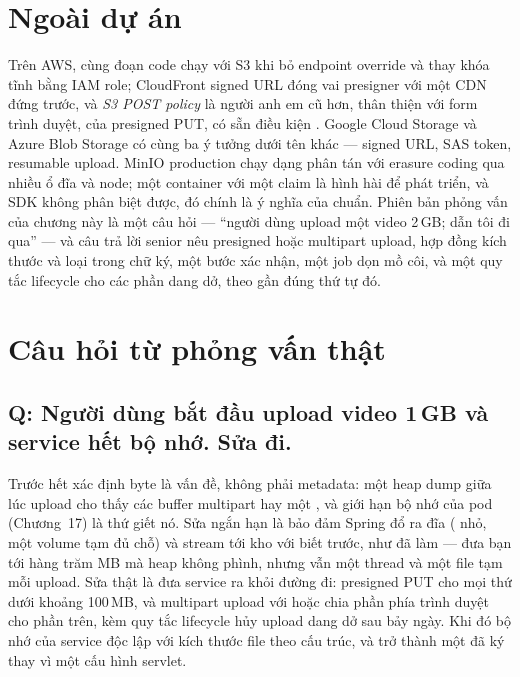 \section{Ngoài dự án}

Trên AWS, cùng đoạn code chạy với S3 khi bỏ endpoint override và thay
khóa tĩnh bằng IAM role; CloudFront signed URL đóng vai presigner với
một CDN đứng trước, và \emph{S3 POST policy} là người anh em cũ hơn,
thân thiện với form trình duyệt, của presigned PUT, có sẵn điều kiện
. Google Cloud Storage và Azure Blob Storage
có cùng ba ý tưởng dưới tên khác --- signed URL, SAS token, resumable
upload. MinIO production chạy dạng phân tán với erasure coding qua nhiều
ổ đĩa và node; một container với một claim là hình hài để phát triển,
và SDK không phân biệt được, đó chính là ý nghĩa của chuẩn. Phiên bản
phỏng vấn của chương này là một câu hỏi --- ``người dùng upload một
video 2\,GB; dẫn tôi đi qua'' --- và câu trả lời senior nêu presigned
hoặc multipart upload, hợp đồng kích thước và loại trong chữ ký, một
bước xác nhận, một job dọn mồ côi, và một quy tắc lifecycle cho các
phần dang dở, theo gần đúng thứ tự đó.

\section{Câu hỏi từ phỏng vấn thật}

\subsection*{Q: Người dùng bắt đầu upload video 1\,GB và service hết bộ nhớ. Sửa đi.}

Trước hết xác định byte là vấn đề, không phải metadata: một heap dump
giữa lúc upload cho thấy các buffer multipart hay một
, và giới hạn bộ nhớ của pod (Chương~17) là
thứ giết nó. Sửa ngắn hạn là bảo đảm Spring đổ ra đĩa
( nhỏ, một volume tạm đủ chỗ) và stream tới
kho với  biết trước, như
 đã làm --- đưa bạn tới hàng trăm MB mà
heap không phình, nhưng vẫn một thread và một file tạm mỗi upload. Sửa
thật là đưa service ra khỏi đường đi: presigned PUT cho mọi thứ dưới
khoảng 100\,MB, và multipart upload với  hoặc
chia phần phía trình duyệt cho phần trên, kèm quy tắc lifecycle hủy
upload dang dở sau bảy ngày. Khi đó bộ nhớ của service độc lập với kích
thước file theo cấu trúc, và  trở thành một
 đã ký thay vì một cấu hình servlet.


